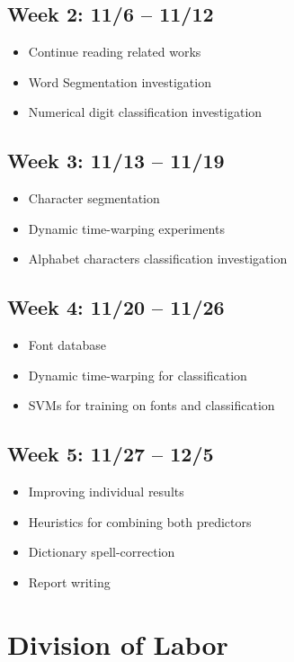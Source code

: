 \documentclass[12pt]{article}
\begin{document}
		\subsection*{Week 2: 11/6 -- 11/12  }
			\begin{itemize}
				\item{Continue reading related works}
				\item{Word Segmentation investigation}
				\item{Numerical digit classification investigation}
			\end{itemize}
		\subsection*{Week 3: 11/13 -- 11/19}
			\begin{itemize}
				\item{Character segmentation}
				\item{Dynamic time-warping experiments}
				\item{Alphabet characters classification investigation}
			\end{itemize}
		\subsection*{Week 4: 11/20 -- 11/26}
			\begin{itemize}
				\item{Font database}
				\item{Dynamic time-warping for classification}
				\item{SVMs for training on fonts and classification}
			\end{itemize}
		\subsection*{Week 5: 11/27 -- 12/5}
			\begin{itemize}
				\item{Improving individual results}
				\item{Heuristics for combining both predictors}
				\item{Dictionary spell-correction}
				\item{Report writing}
			\end{itemize}

	\section{Division of Labor}
	
	

\end{document}
